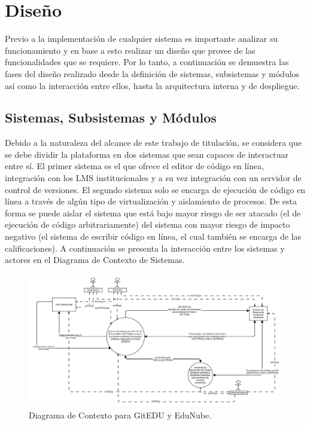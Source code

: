 \section{Diseño}
Previo a la implementación de cualquier sistema es importante analizar su funcionamiento y en base a esto realizar un diseño que provee de las funcionalidades que se requiere. Por lo tanto, a continuación se demuestra las fases del diseño realizado desde la definición de sistemas, subsistemas y módulos así como la interacción entre ellos, hasta la arquitectura interna y de despliegue.

\subsection{Sistemas, Subsistemas y Módulos}
      
Debido a la naturaleza del alcance de este trabajo de titulación, se considera que se debe dividir la plataforma en dos sistemas que sean capaces de interactuar entre sí. El primer sistema es el que ofrece el editor de código en línea, integración con los LMS  institucionales y a su vez integración con un servidor de control de versiones. El segundo sistema solo se encarga de ejecución de código en línea a través de algún tipo de virtualización y aislamiento de procesos. De esta forma se puede aislar el sistema que está bajo mayor riesgo de ser atacado (el de ejecución de código arbitrariamente) del sistema con mayor riesgo de impacto negativo (el sistema de escribir código en línea, el cual también se encarga de las calificaciones). A continuación se presenta la interacción entre los sistemas y actores en el Diagrama de Contexto de Sistemas.

\begin{landscape}

	\begin{figure}
	  \begin{center}
	    \includegraphics[width=1.7\textwidth]{Figures/contexto.png}
	  \end{center}
	  \caption{Diagrama de Contexto para GitEDU y EduNube.}
	  \label{context}
	\end{figure}

\end{landscape}

